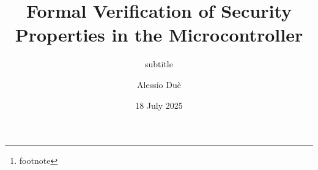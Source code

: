 



\listfiles





\titlehead{
  {\Large Università di Pisa \hfill A.Y.~2024--2025} \\
  {\large Dipartimento di Informatica}
}
\subject{Master's Thesis in Computer Science}
\title{Formal Verification of Security Properties in the \msp Microcontroller}
\subtitle{subtitle }
\author{Alessio Duè}
\date{18 July 2025}
\publishers{relatori...\thanks{footnote}}


\maketitle %
\tableofcontents

\mainmatter






\backmatter
\printbibliography[heading=bibintoc]



